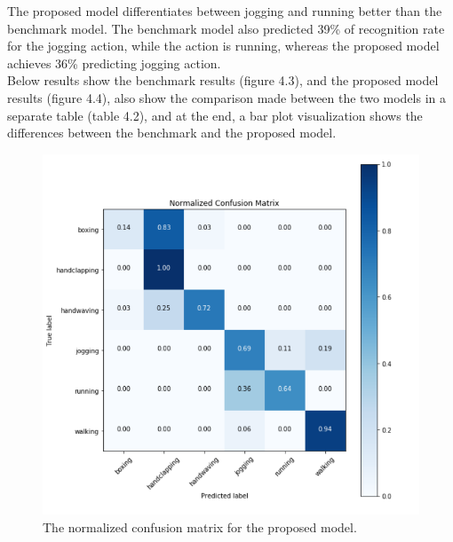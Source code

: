     The proposed model differentiates between jogging and running better than the benchmark model. The benchmark model also predicted 39\% of recognition rate for the jogging action, while the action is running, whereas the proposed model achieves 36\% predicting jogging action.\\
    
    Below results show the benchmark results (figure 4.3), and the proposed model results (figure 4.4), also show the comparison made between the two models in a separate table (table 4.2), and at the end, a bar plot visualization shows the differences between the benchmark and the proposed model.\\
    
    
    \begin{figure}[ht]
    \centering
    \includegraphics{Figures/bench1}
    \decoRule
    \caption [The normalized confusion matrix for the proposed model.]{The normalized confusion matrix for the proposed model.}
    \label{fig:la}
    \end{figure}
    \newpage
    
